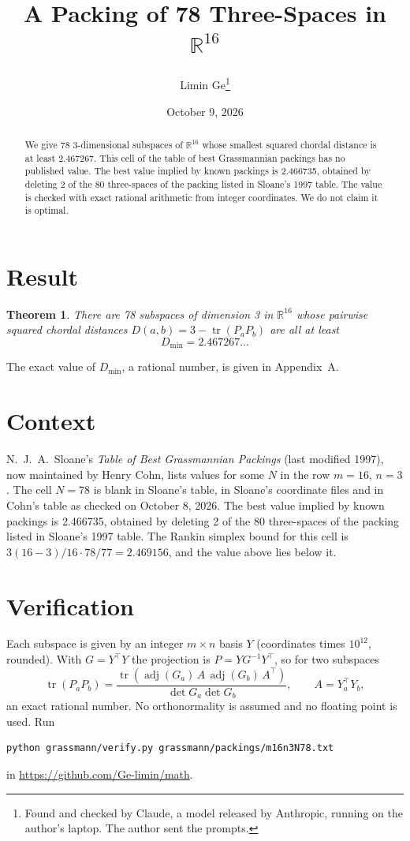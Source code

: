 \documentclass[11pt,a4paper]{article}
\title{A Packing of 78 Three-Spaces in $\mathbb{R}^{16}$}
\author{Limin Ge\thanks{Found and checked by Claude, a model released by Anthropic, running on the author's laptop. The author sent the prompts.}}
\date{October 9, 2026}
\newtheorem*{theorem}{Theorem}
\begin{document}
\maketitle
\begin{abstract}
We give 78 3-dimensional subspaces of $\mathbb{R}^{16}$ whose smallest squared chordal distance is at least 2.467267. This cell of the table of best Grassmannian packings has no published value. The best value implied by known packings is 2.466735, obtained by deleting 2 of the 80 three-spaces of the packing listed in Sloane's 1997 table. The value is checked with exact rational arithmetic from integer coordinates. We do not claim it is optimal.
\end{abstract}

\section{Result}
\begin{theorem}
There are 78 subspaces of dimension 3 in $\mathbb{R}^{16}$ whose pairwise squared chordal distances $D(a,b) = 3 - \operatorname{tr}(P_aP_b)$ are all at least
\[ D_{\min} = 2.467267\ldots \]
\end{theorem}
The exact value of $D_{\min}$, a rational number, is given in Appendix~A.


\section{Context}
N.~J.~A.~Sloane's \emph{Table of Best Grassmannian Packings} (last modified 1997), now maintained by Henry Cohn, lists values for some $N$ in the row $m=16$, $n=3$. The cell $N=78$ is blank in Sloane's table, in Sloane's coordinate files and in Cohn's table as checked on October 8, 2026. The best value implied by known packings is 2.466735, obtained by deleting 2 of the 80 three-spaces of the packing listed in Sloane's 1997 table. The Rankin simplex bound for this cell is $3(16-3)/16\cdot 78/77 = 2.469156$, and the value above lies below it.


\section{Verification}
Each subspace is given by an integer $m\times n$ basis $Y$ (coordinates times $10^{12}$, rounded). With $G=Y^\top Y$ the projection is $P=YG^{-1}Y^\top$, so for two subspaces
\[ \operatorname{tr}(P_aP_b)=\frac{\operatorname{tr}(\operatorname{adj}(G_a)\,A\,\operatorname{adj}(G_b)\,A^\top)}{\det G_a\det G_b},\qquad A=Y_a^\top Y_b, \]
an exact rational number. No orthonormality is assumed and no floating point is used. Run
\begin{verbatim}
python grassmann/verify.py grassmann/packings/m16n3N78.txt
\end{verbatim}
in \url{https://github.com/Ge-limin/math}.
\end{document}
